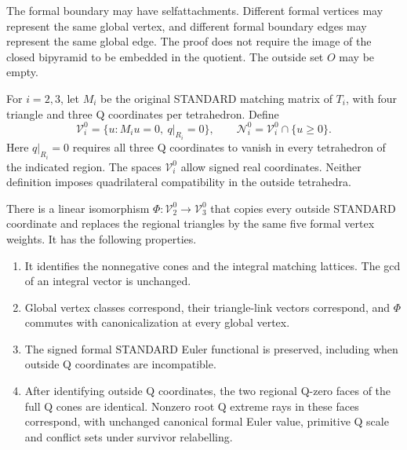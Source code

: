 The formal boundary may have selfattachments.  Different formal vertices
may represent the same global vertex, and different formal boundary edges
may represent the same global edge.  The proof does not require the image
of the closed bipyramid to be embedded in the quotient.  The outside set
$O$ may be empty.

For $i=2,3$, let $M_i$ be the original STANDARD matching matrix of $T_i$,
with four triangle and three Q coordinates per tetrahedron.  Define
\[
 \mathcal V_i^0=\{u:M_i u=0,\ q|_{R_i}=0\},\qquad
 \mathcal N_i^0=\mathcal V_i^0\cap\{u\ge0\}.
\]
Here $q|_{R_i}=0$ requires all three Q coordinates to vanish in every
tetrahedron of the indicated region.  The spaces $\mathcal V_i^0$ allow
signed real coordinates.  Neither definition imposes quadrilateral
compatibility in the outside tetrahedra.

\begin{proposition}
\label{prop:q-zero-pachner-transport}
There is a linear isomorphism
$\Phi:\mathcal V_2^0\longrightarrow\mathcal V_3^0$ that copies every
outside STANDARD coordinate and replaces the regional triangles by the
same five formal vertex weights.  It has the following properties.
\begin{enumerate}
\item It identifies the nonnegative cones and the integral matching
      lattices.  The gcd of an integral vector is unchanged.
\item Global vertex classes correspond, their triangle-link vectors
      correspond, and $\Phi$ commutes with canonicalization at every
      global vertex.
\item The signed formal STANDARD Euler functional is preserved,
      including when outside Q coordinates are incompatible.
\item After identifying outside Q coordinates, the two regional Q-zero
      faces of the full Q cones are identical.  Nonzero root Q extreme
      rays in these faces correspond, with unchanged canonical formal
      Euler value, primitive Q scale and conflict sets under survivor
      relabelling.
\end{enumerate}
\end{proposition}

